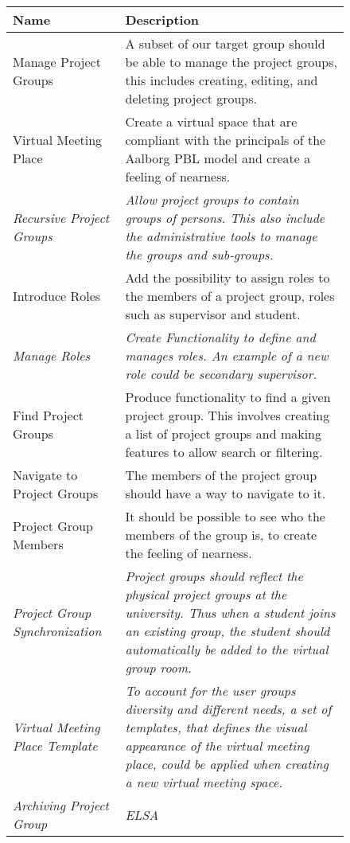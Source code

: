 \begin{figure}%
\begin{tabular}{|p{}|p{}|}
	\hline
	
	\textbf{Name} & \textbf{Description} \\
	\hline
	Manage Project Groups & A subset of our target group should be able to manage the project groups, this includes creating, editing, and deleting project groups.  \\
	\hline
	Virtual Meeting Place & Create a virtual space that are compliant with the principals of the Aalborg PBL model and create a feeling of nearness.  \\
	\hline
	\textit{Recursive Project Groups} & \textit{Allow project groups to contain groups of persons. This also include the administrative tools to manage the groups and sub-groups.} \\
	\hline
	Introduce Roles & Add the possibility to assign roles to the members of a project group, roles such as supervisor and student.   \\
	\hline
	\textit{Manage Roles} & \textit{Create Functionality to define and manages roles. An example of a new role  could be secondary supervisor.} \\
	\hline
	Find Project Groups & Produce functionality to find a given project group. This involves creating a list of project groups and making features to allow search or filtering. \\
	\hline
	Navigate to Project Groups & The members of the project group should have a way to navigate to it. \\
	\hline
	Project Group Members & It should be possible to see who the members of the group is, to create the feeling of nearness. \\
	\hline
	\textit{Project Group Synchronization} & \textit{Project groups should reflect the physical project groups at the university. Thus when a student joins an existing group, the student should automatically be added to the virtual group room.}  \\
	\hline 
	\textit{Virtual Meeting Place Template} & \textit{To account for the user groups diversity and different needs, a set of templates, that defines the visual appearance of the virtual meeting place, could be applied when creating a new virtual meeting space.}  \\
	\hline 
	\textit{Archiving Project Group} & \textit{ELSA } \\
	\hline 
\end{tabular}
\label{fig:productbacklog}
\end{figure}


